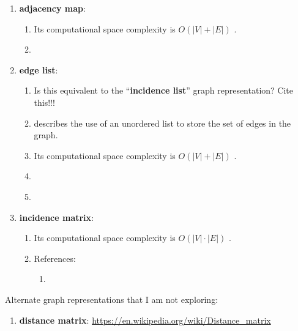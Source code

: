 \begin{enumerate}
\begin{enumerate}
\begin{enumerate}
		\item \cite[\S13.2.2, pp. 603--604]{Goodrich2011}
		\item \cite[\S14.2, pp. 627; \S14.2.2, pp. 630--631]{Goodrich2013}
		\end{enumerate}
	\end{enumerate}
\item {\bf adjacency map}: \vspace{-0.3cm}
	\begin{enumerate} \itemsep -2pt
	\item Its computational space complexity is $O(|V|+|E|)$ \cite[\S14.2, pp. 627]{Goodrich2013}.
	\item \cite[\S14.2, pp. 627; \S14.2.3, pp. 632; \S14.2.5, pp. 634--637]{Goodrich2013}
	\end{enumerate}
\item {\bf edge list}: \vspace{-0.3cm}
	\begin{enumerate} \itemsep -2pt
	\item Is this equivalent to the ``{\bf incidence list}'' graph representation? {\Huge Cite this!!!}
	\item \cite[\S5, pp. 78]{Cormen2013} describes the use of an unordered list to store the set of edges in the graph.
	\item Its computational space complexity is $O(|V|+|E|)$ \cite[\S13.2, pp. 600]{Goodrich2011} \cite[\S14.2, pp. 627]{Goodrich2013}.
	\item \cite[\S13.2.1, pp. 600--602]{Goodrich2011}
	\item \cite[\S14.2, pp. 627; \S14.2.1, pp. 628--629]{Goodrich2013}
	\end{enumerate}
\item {\bf incidence matrix}: \vspace{-0.3cm}
	\begin{enumerate} \itemsep -2pt
	\item Its computational space complexity is $O(|V| \cdot |E|)$ \cite{WikipediaContributors2018a49}.
	\item References: \vspace{-0.2cm}
		\begin{enumerate} \itemsep -2pt
		\item \cite{WikipediaContributors2018a49}
		\end{enumerate}
	\end{enumerate}
\end{enumerate}


Alternate graph representations that I am not exploring: \vspace{-0.3cm}
\begin{enumerate} \itemsep -4pt
\item {\bf distance matrix}: \url{https://en.wikipedia.org/wiki/Distance_matrix}
\end{enumerate}

